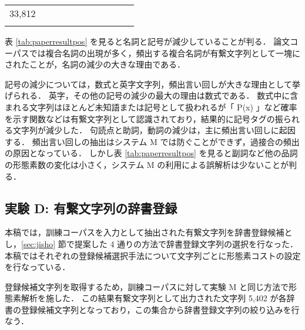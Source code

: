 \begin{table}[hbt]
\begin{small}
\begin{center}
\begin{tabular}{l|rrrrrrrrr|r}
{33,812}\\
\hspace{-3pt}{\footnotesize システム M}&\hspace{-2pt}{\footnotesize
67}&\hspace{-2pt}{\footnotesize 2,218}&\hspace{-2pt}{\footnotesize
9,086}&\hspace{-2pt}{\footnotesize 3,468}&\hspace{-2pt}{\footnotesize
215}&\hspace{-2pt}{\footnotesize 321}&\hspace{-2pt}{\footnotesize
1,641}&\hspace{-2pt}{\footnotesize 7,346}&\hspace{-2pt}{\footnotesize
2,898}&\hspace{-2pt}{\footnotesize 28,048}\\

\end{tabular}
\end{center}
\end{small}
\end{table}
表 \ref{tab:paperresultpos} を見ると名詞と記号が減少していることが判る．
論文コーパスでは複合名詞の出現が多く，頻出する複合名詞が有繋文字列として一塊にされたことが，名詞の減少の大きな理由である．

記号の減少については，数式と英字文字列，頻出言い回しが大きな理由として挙げられる．
英字，その他の記号の減少の最大の理由は数式である．
数式中に含まれる文字列はほとんど未知語または記号として扱われるが「 P(x) 」など確率を示す関数などは有繋文字列として認識されており，結果的に記号タグの振られる文字列が減少した．
句読点と助詞，動詞の減少は，主に頻出言い回しに起因する．
頻出言い回しの抽出はシステム M では防ぐことができず，過接合の頻出の原因となっている．
しかし表 \ref{tab:paperresultpos} を見ると副詞など他の品詞の形態素数の変化は小さく，システム M の利用による誤解析は少ないことが判る．
\subsection{実験 D: 有繋文字列の辞書登録}
本稿では，訓練コーパスを入力として抽出された有繋文字列を辞書登録候補とし，\ref{sec:jisho} 節で提案した 4 通りの方法で辞書登録文字列の選択を行なった．
本稿ではそれぞれの登録候補選択手法について文字列ごとに形態素コストの設定を行なっている．

登録候補文字列を取得するため，訓練コーパスに対して実験 M と同じ方法で形態素解析を施した．
この結果有繋文字列として出力された文字列 5,402 が各辞書の登録候補文字列となっており，この集合から辞書登録文字列の絞り込みを行なう．

